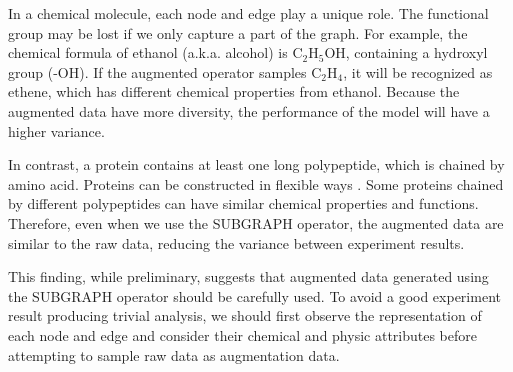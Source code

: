 In a chemical molecule, each node and edge play a unique role. The functional group may be lost if we only capture a part of the graph. For example, the chemical formula of ethanol (a.k.a. alcohol) is $\text{C}_{2}\text{H}_{5}\text{OH}$, containing a hydroxyl group (-OH). If the augmented operator samples $\text{C}_{2}\text{H}_{4}$, it will be recognized as ethene, which has different chemical properties from ethanol. Because the augmented data have more diversity, the performance of the model will have a higher variance.


In contrast, a protein contains at least one long polypeptide, which is chained by amino acid. Proteins can be constructed in flexible ways \cite{accurateprotein}. Some proteins chained by different polypeptides can have similar chemical properties and functions. Therefore, even when we use the SUBGRAPH operator, the augmented data are similar to the raw data, reducing the variance between experiment results.



This finding, while preliminary, suggests that augmented data generated using the SUBGRAPH operator should be carefully used. To avoid a good experiment result producing trivial analysis, we should first observe the representation of each node and edge and consider their chemical and physic attributes before attempting to sample raw data as augmentation data.

